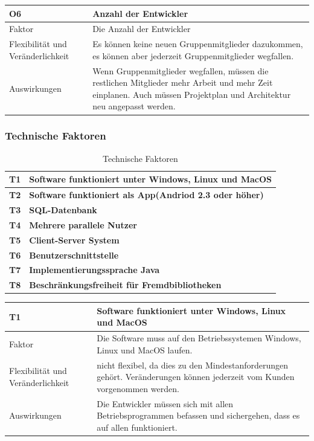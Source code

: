 \documentclass[fontsize=12pt,paper=a4,twoside]{scrartcl}
\begin{document}
\begin{table}[H]
\begin{tabular}{|p{3cm}|p{12cm}|}\hline
\textbf{O6} & \textbf{Anzahl der Entwickler}\\ \hline \hline
Faktor & Die Anzahl der Entwickler\\ \hline
Flexibilität und Veränderlichkeit & Es können keine neuen Gruppenmitglieder dazukommen, es können aber jederzeit Gruppenmitglieder wegfallen. \\ \hline
Auswirkungen & Wenn Gruppenmitglieder wegfallen, müssen die restlichen Mitglieder mehr Arbeit und mehr Zeit einplanen. Auch müssen Projektplan und Architektur neu angepasst werden.\\ \hline
\end{tabular}
\end{table}

\subsubsection{Technische Faktoren}
\label{sec:techfaktoren}

\begin{table}[H]
\centering
\caption{Technische Faktoren}
\begin{tabular}{|l|l|} \hline
\textbf{T1} & \textbf{Software funktioniert unter Windows, Linux und MacOS} \\ \hline
\textbf{T2} & \textbf{Software funktioniert als App(Andriod 2.3 oder höher)}\\ \hline
\textbf{T3} & \textbf{SQL-Datenbank} \\ \hline
\textbf{T4} & \textbf{Mehrere parallele Nutzer} \\ \hline
\textbf{T5} & \textbf{Client-Server System} \\ \hline
\textbf{T6} & \textbf{Benutzerschnittstelle} \\ \hline
\textbf{T7} & \textbf{Implementierungssprache Java} \\ \hline
\textbf{T8} &  \textbf{Beschränkungsfreiheit für Fremdbibliotheken}\\ \hline
\end{tabular}
\end{table}

\begin{table}[H]
\begin{tabular}{|p{3cm}|p{12cm}|}\hline
\textbf{T1} & \textbf{Software funktioniert unter Windows, Linux und MacOS} \\ \hline \hline
Faktor & Die Software muss auf den Betriebssystemen Windows, Linux und MacOS laufen.\\ \hline
Flexibilität und Veränderlichkeit & nicht flexibel, da dies zu den Mindestanforderungen gehört. Veränderungen können jederzeit vom Kunden vorgenommen werden.  \\ \hline
Auswirkungen & Die Entwickler müssen sich mit allen Betriebsprogrammen befassen und sichergehen, dass es auf allen funktioniert.\\ \hline
\end{tabular}
\end{table}
\end{document}

